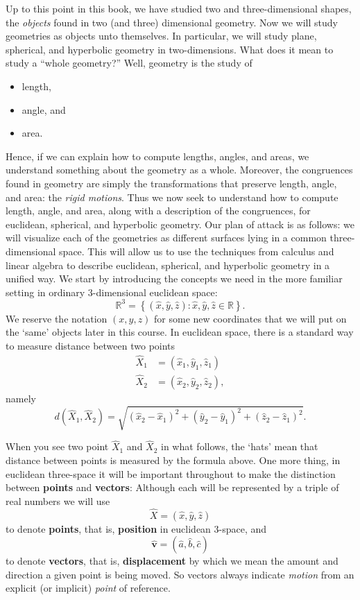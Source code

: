 \documentclass[newpage,hints,handout]{ximera}
\begin{document}
Up to this point in this book, we have studied two and three-dimensional shapes, the \textit{objects} found in two (and three) dimensional geometry. Now we will study geometries as objects unto themselves. In particular, we will study plane, spherical, and hyperbolic geometry in two-dimensions. What does it mean to study a ``whole geometry?'' Well, geometry is the study of 
\begin{itemize}
\item length,
\item angle, and
\item area.
\end{itemize}
Hence, if we can explain how to compute lengths, angles, and areas, we
understand something about the geometry as a whole. Moreover, the
congruences found in geometry are simply the transformations that
preserve length, angle, and area: the \textit{rigid motions}. Thus we
now seek to understand how to compute length, angle, and area, along
with a description of the congruences, for euclidean, spherical, and
hyperbolic geometry.  Our plan of attack is as follows: we will
visualize each of the geometries as different surfaces lying in a
common three-dimensional space. This will allow us to use the
techniques from calculus and linear algebra to describe euclidean,
spherical, and hyperbolic geometry in a unified way. We start by
introducing the concepts we need in the more familiar setting in
ordinary $3$-dimensional euclidean space:
\[
\mathbb{R}^{3}=\left\{(\hat{x},\hat{y},\hat{z}):
\hat{x},\hat{y},\hat{z} \in \mathbb{R}\right\}.
\]
We reserve the notation $\left( x,y,z\right) $ for some new
coordinates that we will put on the `same' objects later in this
course. In euclidean space, there is a standard way to measure
distance between two points%
\begin{align*}
\hat{X}_{1}  &  =(  \hat{x}_{1},\hat{y}_{1},\hat{z}_{1}) \\
\hat{X}_{2}  &  =(  \hat{x}_{2},\hat{y}_{2},\hat{z}_{2})  ,
\end{align*}
namely%
\[
d(\hat{X}_{1},\hat{X}_{2})=\sqrt{(\hat{x}_{2}-\hat{x}_{1})^{2}+
  (\hat{y}_{2}-\hat{y}_{1})^{2}+(\hat{z}_{2}-\hat{z}_{1})^{2}}. \label{0}%
\]

When you see two point $\hat{X}_1$ and $\hat{X}_2$ in what follows,
the `hats' mean that distance between points is measured by the
formula above. One more thing, in euclidean three-space it will be
important throughout to make the distinction between \textbf{points}
and \textbf{vectors}: Although each will be represented by a triple of
real numbers we will use%
\[
\hat{X}=(\hat{x},\hat{y},\hat{z})
\]
to denote \textbf{points}, that is, \textbf{position} in euclidean $3$-space,
and%
\[
\hat{\mathbf v}=(\hat{a},\hat{b},\hat{c})
\]
to denote \textbf{vectors}, that is, \textbf{displacement} by which we mean
the amount and direction a given point is being moved. So vectors always
indicate \textit{motion} from an explicit (or implicit) \textit{point} of
reference. 
\end{document}
